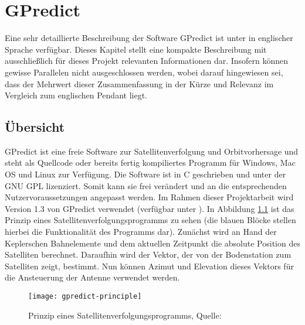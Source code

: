 
\chapter{GPredict}

Eine sehr detaillierte Beschreibung der Software GPredict ist unter \cite{gpredictmanual} in englischer Sprache verfügbar. Dieses Kapitel stellt eine kompakte Beschreibung mit ausschließlich für dieses Projekt relevanten Informationen dar. Insofern können gewisse Parallelen nicht ausgeschlossen werden, wobei darauf hingewiesen sei, dass der Mehrwert dieser Zusammenfassung in der Kürze und Relevanz im Vergleich zum englischen Pendant liegt.

\section{Übersicht}

GPredict ist eine freie Software zur Satellitenverfolgung und Orbitvorhersage und steht als Quellcode oder bereits fertig kompiliertes Programm für Windows, Mac OS und Linux zur Verfügung. Die Software ist in C geschrieben und unter der GNU \ac{GPL} lizenziert. Somit kann sie frei verändert und an die entsprechenden Nutzervoraussetzungen angepasst werden. Im Rahmen dieser Projektarbeit wird Version 1.3 von GPredict verwendet (verfügbar unter \cite{gpredictdownload}).\newpar
In Abbildung \ref{fig:gpredict-principle} ist das Prinzip eines Satellitenverfolgungsprogramms zu sehen (die blauen Blöcke stellen hierbei die Funktionalität des Programms dar). Zunächst wird an Hand der Keplerschen Bahnelemente und dem aktuellen Zeitpunkt die absolute Position des Satelliten berechnet. Daraufhin wird der Vektor, der von der Bodenstation zum Satelliten zeigt, bestimmt. Nun können Azimut und Elevation dieses Vektors für die Ansteuerung der Antenne verwendet werden.

\begin{figure}[h]
	\centering
	\texttt{[image: gpredict-principle]}
	\caption{Prinzip eines Satellitenverfolgungsprogramms, Quelle: \cite{gpredictmanual}}
	\label{fig:gpredict-principle} 
\end{figure}

